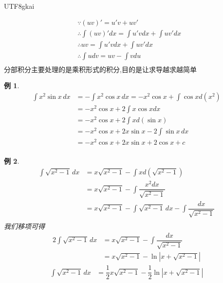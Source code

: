 \documentclass{article}
\newtheorem{example}{例}[subsection]
\newenvironment{cproof}{%
\heiti{证明}\kaishu
}{%
}
\begin{document}
\begin{CJK}{UTF8}{gkai}
\begin{cproof}
\[
\begin{aligned}  
&\because (uv)' = u'v + uv'\\
&\therefore\int(uv)'dx = \int u' v dx + \int u v' dx\\
&\therefore uv = \int u' v dx + \int u v' dx\\
&\therefore \int u dv = uv- \int v du\\
\end{aligned}
\]
\end{cproof}
分部积分主要处理的是乘积形式的积分,目的是让求导越求越简单\\
\begin{example}
  \[
  \begin{aligned}  
  \int x^2 \sin x \, dx &= -\int x^2 \cos x\, dx = -x^2 \cos x + \int \cos x d(x^2) \\
  &= -x^2 \cos x + 2\int x\cos x dx \\ 
  &= -x^2 \cos x + 2\int x d(\sin x)\\
  &= -x^2 \cos x + 2 x \sin x - 2 \int \sin x\, dx  \\
  &=-x^2 \cos x + 2 x \sin x + 2 \cos x + c\\
  \end{aligned}
  \]
\end{example}

\begin{example}
  \[
  \begin{aligned}  
  \int \sqrt{x^2 - 1}\, dx &= x\sqrt{x^2 -1} - \int x d(\sqrt{x^2 -1})\\
  &= x\sqrt{x^2 -1} - \int \dfrac{x^2 dx}{\sqrt{x^2 -1}} \\
  &= x\sqrt{x^2 -1} - \int\sqrt{x^2 -1}\, dx - \int \dfrac{dx}{\sqrt{x^2 -1}}\\
  \end{aligned}
  \]
  我们移项可得
  \[
    \begin{aligned}  
    2\int \sqrt{x^2 - 1} \,dx &= x\sqrt{x^2 -1} - \int \dfrac{dx}{\sqrt{x^2 -1}}\\
    &= x\sqrt{x^2 -1} - \ln\left|x + \sqrt{x^2 - 1} \right|
    \end{aligned}
    \]
  \[
    \begin{aligned}  
    \int \sqrt{x^2 - 1} \,dx &= \dfrac{1}{2}x\sqrt{x^2 -1} - \dfrac{1}{2}\ln\left|x + \sqrt{x^2 - 1} \right|
    \end{aligned}
    \]

\end{example}


\end{CJK}
\end{document}
